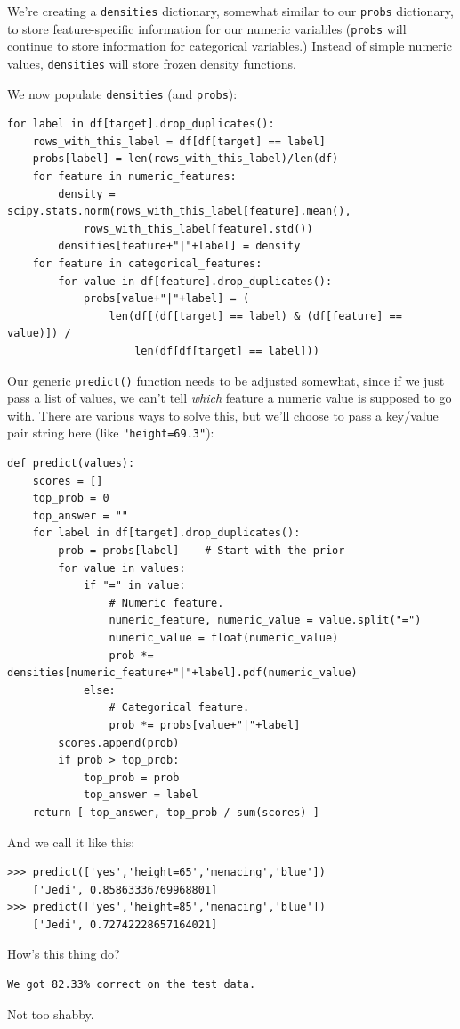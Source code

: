 We're creating a \texttt{densities} dictionary, somewhat similar to our
\texttt{probs} dictionary, to store feature-specific information for our
numeric variables (\texttt{probs} will continue to store information for
categorical variables.) Instead of simple numeric values, \texttt{densities}
will store frozen density functions.

We now populate \texttt{densities} (and \texttt{probs}):

\begin{Verbatim}[fontsize=\small,samepage=true,frame=single]
for label in df[target].drop_duplicates():
    rows_with_this_label = df[df[target] == label]
    probs[label] = len(rows_with_this_label)/len(df)
    for feature in numeric_features:
        density = scipy.stats.norm(rows_with_this_label[feature].mean(),
            rows_with_this_label[feature].std())
        densities[feature+"|"+label] = density
    for feature in categorical_features:
        for value in df[feature].drop_duplicates():
            probs[value+"|"+label] = (
                len(df[(df[target] == label) & (df[feature] == value)]) / 
                    len(df[df[target] == label]))
\end{Verbatim}

Our generic \texttt{predict()} function needs to be adjusted somewhat, since
if we just pass a list of values, we can't tell \textit{which} feature a
numeric value is supposed to go with. There are various ways to solve this,
but we'll choose to pass a key/value pair string here (like
\texttt{"height=69.3"}):

\begin{Verbatim}[fontsize=\footnotesize,samepage=true,frame=single]
def predict(values):
    scores = []
    top_prob = 0
    top_answer = ""
    for label in df[target].drop_duplicates():
        prob = probs[label]    # Start with the prior
        for value in values:
            if "=" in value:
                # Numeric feature.
                numeric_feature, numeric_value = value.split("=")
                numeric_value = float(numeric_value)
                prob *= densities[numeric_feature+"|"+label].pdf(numeric_value)
            else:
                # Categorical feature.
                prob *= probs[value+"|"+label]
        scores.append(prob)
        if prob > top_prob:
            top_prob = prob
            top_answer = label
    return [ top_answer, top_prob / sum(scores) ]
\end{Verbatim}

And we call it like this:
\begin{Verbatim}[fontsize=\small,samepage=true,frame=single]
>>> predict(['yes','height=65','menacing','blue'])
    ['Jedi', 0.85863336769968801]
>>> predict(['yes','height=85','menacing','blue'])
    ['Jedi', 0.72742228657164021]
\end{Verbatim}

How's this thing do?

\begin{Verbatim}[fontsize=\small,samepage=true,frame=single]
We got 82.33% correct on the test data.
\end{Verbatim}

Not too shabby.

